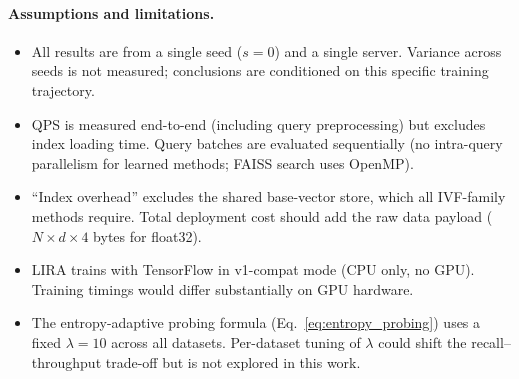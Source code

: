 \paragraph{Assumptions and limitations.}
\begin{itemize}
  \item All results are from a single seed ($s\!=\!0$) and a single server.
        Variance across seeds is not measured; conclusions are conditioned on
        this specific training trajectory.
  \item QPS is measured end-to-end (including query preprocessing) but excludes
        index loading time.  Query batches are evaluated sequentially (no
        intra-query parallelism for learned methods; FAISS search uses
        OpenMP).
  \item ``Index overhead'' excludes the shared base-vector store, which all
        IVF-family methods require.  Total deployment cost should add the
        raw data payload ($N \times d \times 4$ bytes for float32).
  \item LIRA trains with TensorFlow in v1-compat mode (CPU only, no GPU).
        Training timings would differ substantially on GPU hardware.
  \item The entropy-adaptive probing formula
        (Eq.~\ref{eq:entropy_probing}) uses a fixed $\lambda\!=\!10$
        across all datasets.  Per-dataset tuning of $\lambda$ could shift
        the recall--throughput trade-off but is not explored in this work.
\end{itemize}

